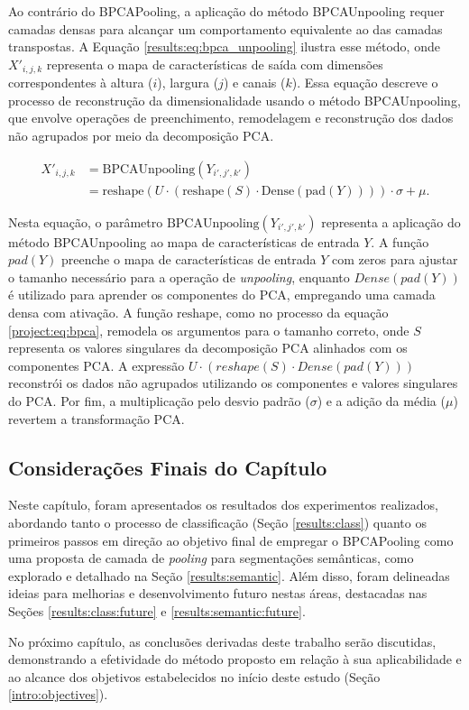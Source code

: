Ao contrário do BPCAPooling, a aplicação do método BPCAUnpooling requer camadas densas para alcançar um comportamento equivalente ao das camadas transpostas. A Equação \ref{results:eq:bpca_unpooling} ilustra esse método, onde $X'_{i,j,k}$ representa o mapa de características de saída com dimensões correspondentes à altura ($i$), largura ($j$) e canais ($k$). Essa equação descreve o processo de reconstrução da dimensionalidade usando o método BPCAUnpooling, que envolve operações de preenchimento, remodelagem e reconstrução dos dados não agrupados por meio da decomposição PCA.

\begin{equation}
    \label{results:eq:bpca_unpooling}
    \begin{split}
        X'_{i,j,k} &= \text{BPCAUnpooling}(Y_{i',j',k'}) \\
                  &= \text{reshape}\left(U \cdot \left(\text{reshape}(S) \cdot \text{Dense}\left(\text{pad}(Y)\right)\right)\right) \cdot {\sigma} + {\mu}.
    \end{split}
\end{equation}

Nesta equação, o parâmetro $\text{BPCAUnpooling}(Y_{i',j',k'})$ representa a aplicação do método BPCAUnpooling ao mapa de características de entrada $Y$. A função $pad(Y)$ preenche o mapa de características de entrada $Y$ com zeros para ajustar o tamanho necessário para a operação de \textit{unpooling}, enquanto $Dense(pad(Y))$ é utilizado para aprender os componentes do PCA, empregando uma camada densa com ativação. A função $\text{reshape}$, como no processo da equação \ref{project:eq:bpca}, remodela os argumentos para o tamanho correto, onde $S$ representa os valores singulares da decomposição PCA alinhados com os componentes PCA. A expressão $U \cdot (reshape(S) \cdot Dense(pad(Y)))$ reconstrói os dados não agrupados utilizando os componentes e valores singulares do PCA. Por fim, a multiplicação pelo desvio padrão ($\sigma$) e a adição da média ($\mu$) revertem a transformação PCA.

\subsection{Considerações Finais do Capítulo}
\label{result:final}
Neste capítulo, foram apresentados os resultados dos experimentos realizados, abordando tanto o processo de classificação (Seção \ref{results:class}) quanto os primeiros passos em direção ao objetivo final de empregar o BPCAPooling como uma proposta de camada de \textit{pooling} para segmentações semânticas, como explorado e detalhado na Seção \ref{results:semantic}. Além disso, foram delineadas ideias para melhorias e desenvolvimento futuro nestas áreas, destacadas nas Seções \ref{results:class:future} e \ref{results:semantic:future}.

No próximo capítulo, as conclusões derivadas deste trabalho serão discutidas, demonstrando a efetividade do método proposto em relação à sua aplicabilidade e ao alcance dos objetivos estabelecidos no início deste estudo (Seção \ref{intro:objectives}).